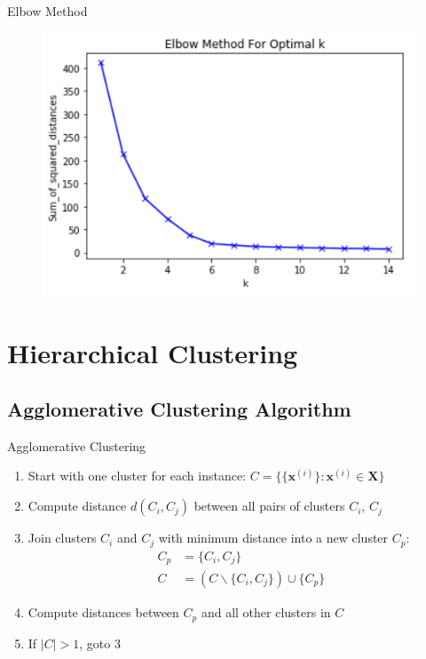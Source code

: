 \begin{frame}{Elbow Method}{}
	\begin{figure}
		\centering
		\includegraphics[scale=0.6]{12_clustering/02_img/elbow}
	\end{figure}
\end{frame}


\section{Hierarchical Clustering}

\subsection{Agglomerative Clustering Algorithm}

\begin{frame}{Agglomerative Clustering}{}
	\begin{enumerate}
		\item Start with one cluster for each instance: $C = \{ \{ \bm{x}^{(i)}\} : \bm{x}^{(i)} \in \bm{X} \}$
		\item Compute distance $d(C_i, C_j)$ between all pairs of clusters $C_i$, $C_j$
		\item Join clusters $C_i$ and $C_j$ with minimum distance into a new cluster $C_p$:
		\begin{align*}
			C_p
				&= \{ C_i, C_j \} \\
			C
				&= (C \backslash \{ C_i, C_j \}) \cup \{ C_p \}
		\end{align*}
		\item Compute distances between $C_p$ and all other clusters in $C$
		\item If $\vert C \vert > 1$, goto 3
	\end{enumerate}
\end{frame}


